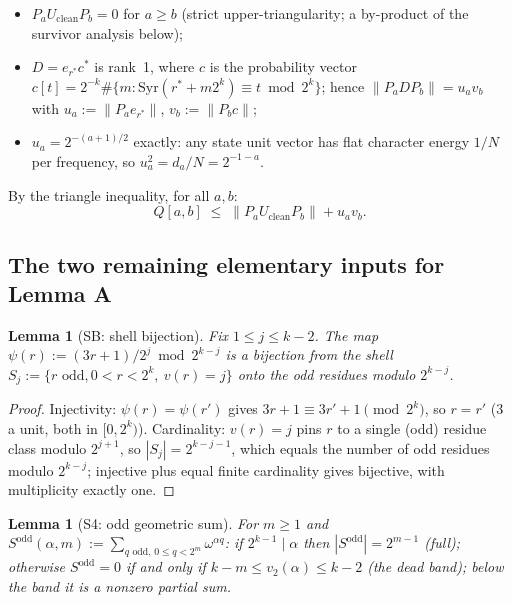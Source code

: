 \documentclass[12pt,a4paper]{article}
\newtheorem{lemma}[theorem]{Lemma}
\newcommand{\Syr}{\mathrm{Syr}}
\newcommand{\vtwo}{v_2}
\newcommand{\Sodd}{S^{\mathrm{odd}}}
\begin{document}
\begin{itemize}
\item[\textbf{(R1)}] $P_a U_{\mathrm{clean}} P_b = 0$ for $a \ge b$ (strict upper-triangularity;
  a by-product of the survivor analysis below);
\item[\textbf{(R2)}] $D = e_{r^\ast} c^{\ast}$ is rank~1, where $c$ is the probability vector
  $c[t] = 2^{-k} \#\{m : \Syr(r^\ast + m2^k) \equiv t \bmod 2^k\}$; hence
  $\|P_a D P_b\| = u_a v_b$ with $u_a := \|P_a e_{r^\ast}\|$, $v_b := \|P_b c\|$;
\item[\textbf{(R3)}] $u_a = 2^{-(a+1)/2}$ exactly: any state unit vector has flat character
  energy $1/N$ per frequency, so $u_a^2 = d_a / N = 2^{-1-a}$.
\end{itemize}

By the triangle inequality, for all $a, b$:
\begin{equation}\label{eq:triangle}
  Q[a,b] \;\le\; \|P_a U_{\mathrm{clean}} P_b\| + u_a v_b.
\end{equation}

\subsection{The two remaining elementary inputs for Lemma A}

\begin{lemma}[SB: shell bijection]\label{lem:SB}
Fix $1 \le j \le k-2$. The map $\psi(r) := (3r+1)/2^j \bmod 2^{k-j}$ is a bijection from the
shell $S_j := \{ r \text{ odd}, 0 < r < 2^k,\ v(r) = j \}$ onto the odd residues modulo
$2^{k-j}$.
\end{lemma}

\begin{proof}
Injectivity: $\psi(r) = \psi(r')$ gives $3r + 1 \equiv 3r' + 1 \pmod{2^k}$, so $r = r'$ (3 a
unit, both in $[0, 2^k)$). Cardinality: $v(r) = j$ pins $r$ to a single (odd) residue class
modulo $2^{j+1}$, so $|S_j| = 2^{k-j-1}$, which equals the number of odd residues modulo
$2^{k-j}$; injective plus equal finite cardinality gives bijective, with multiplicity exactly
one.
\end{proof}

\begin{lemma}[S4: odd geometric sum]\label{lem:S4}
For $m \ge 1$ and $\Sodd(\alpha, m) := \sum_{q \text{ odd},\, 0 \le q < 2^m} \omega^{\alpha q}$:
if $2^{k-1} \mid \alpha$ then $|\Sodd| = 2^{m-1}$ (full); otherwise $\Sodd = 0$ if and only if
$k - m \le \vtwo(\alpha) \le k - 2$ (the dead band); below the band it is a nonzero partial sum.
\end{lemma}
\end{document}
